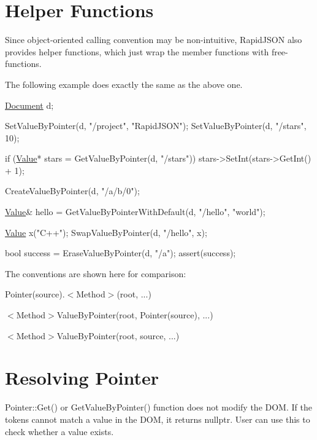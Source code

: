 \hypertarget{md_Cadriciel_Commun_Externe_RapidJSON_doc_pointer_HelperFunctions}{}\section{Helper Functions}\label{md_Cadriciel_Commun_Externe_RapidJSON_doc_pointer_HelperFunctions}
Since object-\/oriented calling convention may be non-\/intuitive, Rapid\+J\+S\+ON also provides helper functions, which just wrap the member functions with free-\/functions.

The following example does exactly the same as the above one.


\begin{DoxyCode}
\hyperlink{class_generic_document}{Document} d;

SetValueByPointer(d, \textcolor{stringliteral}{"/project"}, \textcolor{stringliteral}{"RapidJSON"});
SetValueByPointer(d, \textcolor{stringliteral}{"/stars"}, 10);

\textcolor{keywordflow}{if} (\hyperlink{class_generic_value}{Value}* stars = GetValueByPointer(d, \textcolor{stringliteral}{"/stars"}))
    stars->SetInt(stars->GetInt() + 1);

CreateValueByPointer(d, \textcolor{stringliteral}{"/a/b/0"});

\hyperlink{class_generic_value}{Value}& hello = GetValueByPointerWithDefault(d, \textcolor{stringliteral}{"/hello"}, \textcolor{stringliteral}{"world"});

\hyperlink{class_generic_value}{Value} x(\textcolor{stringliteral}{"C++"});
SwapValueByPointer(d, \textcolor{stringliteral}{"/hello"}, x);

\textcolor{keywordtype}{bool} success = EraseValueByPointer(d, \textcolor{stringliteral}{"/a"});
assert(success);
\end{DoxyCode}


The conventions are shown here for comparison\+:


\begin{DoxyEnumerate}
\item {\ttfamily Pointer(source).$<$Method$>$(root, ...)}
\item {\ttfamily $<$Method$>$Value\+By\+Pointer(root, Pointer(source), ...)}
\item {\ttfamily $<$Method$>$Value\+By\+Pointer(root, source, ...)}
\end{DoxyEnumerate}\hypertarget{md_Cadriciel_Commun_Externe_RapidJSON_doc_pointer_ResolvingPointer}{}\section{Resolving Pointer}\label{md_Cadriciel_Commun_Externe_RapidJSON_doc_pointer_ResolvingPointer}
{\ttfamily Pointer\+::\+Get()} or {\ttfamily Get\+Value\+By\+Pointer()} function does not modify the D\+OM. If the tokens cannot match a value in the D\+OM, it returns {\ttfamily nullptr}. User can use this to check whether a value exists.

